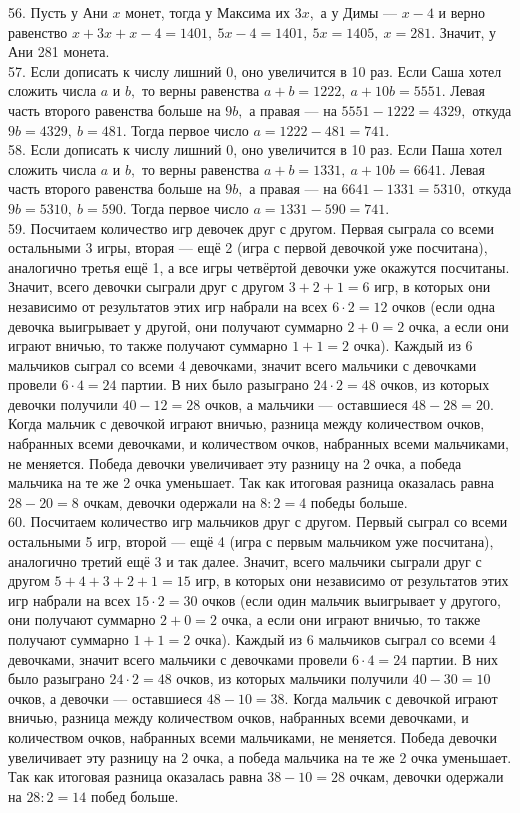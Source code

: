 56. Пусть у Ани $x$ монет, тогда у Максима их $3x,$ а у Димы --- $x-4$ и верно равенство $x+3x+x-4=1401,\ 5x-4=1401,\ 5x=1405,\ x=281.$ Значит, у Ани 281 монета.\\
57. Если дописать к числу лишний 0, оно увеличится в 10 раз. Если Саша хотел сложить числа $a$ и $b,$ то верны равенства $a+b=1222,\ a+10b=5551.$ Левая часть второго равенства больше на $9b,$ а правая --- на $5551-1222=4329,$ откуда $9b=4329,\ b=481.$ Тогда первое число $a=1222-481=741.$\\
58. Если дописать к числу лишний 0, оно увеличится в 10 раз. Если Паша хотел сложить числа $a$ и $b,$ то верны равенства $a+b=1331,\ a+10b=6641.$ Левая часть второго равенства больше на $9b,$ а правая --- на $6641-1331=5310,$ откуда $9b=5310,\ b=590.$ Тогда первое число $a=1331-590=741.$\\
59. Посчитаем количество игр девочек друг с другом. Первая сыграла со всеми остальными 3 игры, вторая --- ещё 2 (игра с первой девочкой уже посчитана), аналогично третья ещё 1, а все игры четвёртой девочки уже окажутся посчитаны. Значит, всего девочки сыграли друг с другом $3+2+1=6$ игр, в которых они независимо от результатов этих игр набрали на всех $6\cdot2=12$ очков (если одна девочка выигрывает у другой, они получают суммарно $2+0=2$ очка, а если они играют вничью, то также получают суммарно $1+1=2$ очка). Каждый из 6 мальчиков сыграл со всеми 4 девочками, значит всего мальчики с девочками провели $6\cdot4=24$ партии. В них было разыграно $24\cdot2=48$ очков, из которых девочки получили $40-12=28$ очков, а мальчики --- оставшиеся $48-28=20.$ Когда мальчик с девочкой играют вничью, разница между количеством очков, набранных всеми девочками, и количеством очков, набранных всеми мальчиками, не меняется. Победа девочки увеличивает эту разницу на 2 очка, а победа мальчика на те же 2 очка уменьшает. Так как итоговая разница оказалась равна $28-20=8$ очкам, девочки одержали на $8:2=4$ победы больше.\\
60. Посчитаем количество игр мальчиков друг с другом. Первый сыграл со всеми остальными 5 игр, второй --- ещё 4 (игра с первым мальчиком уже посчитана), аналогично третий ещё 3 и так далее. Значит, всего мальчики сыграли друг с другом $5+4+3+2+1=15$ игр, в которых они независимо от результатов этих игр набрали на всех $15\cdot2=30$ очков (если один мальчик выигрывает у другого, они получают суммарно $2+0=2$ очка, а если они играют вничью, то также получают суммарно $1+1=2$ очка). Каждый из 6 мальчиков сыграл со всеми 4 девочками, значит всего мальчики с девочками провели $6\cdot4=24$ партии. В них было разыграно $24\cdot2=48$ очков, из которых мальчики получили $40-30=10$ очков, а девочки --- оставшиеся $48-10=38.$ Когда мальчик с девочкой играют вничью, разница между количеством очков, набранных всеми девочками, и количеством очков, набранных всеми мальчиками, не меняется. Победа девочки увеличивает эту разницу на 2 очка, а победа мальчика на те же 2 очка уменьшает. Так как итоговая разница оказалась равна $38-10=28$ очкам, девочки одержали на $28:2=14$ побед больше.\\
